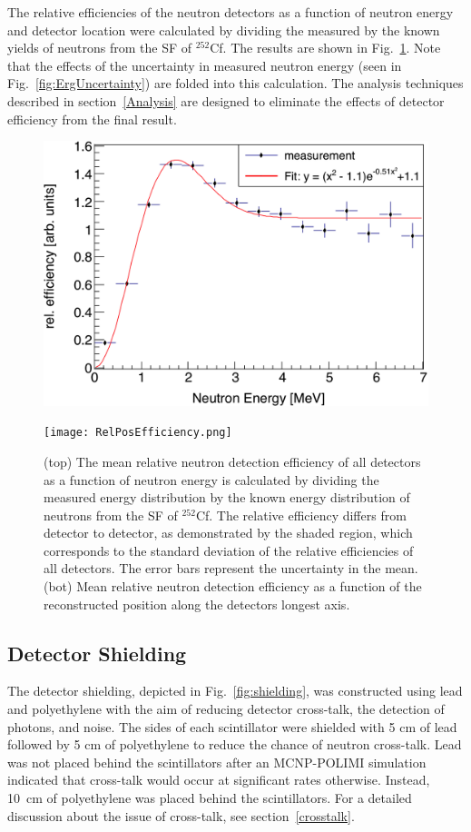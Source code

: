 The relative efficiencies of the neutron detectors as a function of neutron energy and detector location were calculated by dividing the measured by the known yields of neutrons from the SF of $^{252}$Cf.
The results are shown in Fig.~\ref{fig:RelErgEfficiency}.
Note that the effects of the uncertainty in measured neutron energy (seen in Fig.~\ref{fig:ErgUncertainty}) are folded into this calculation.
The analysis techniques described in section~\ref{Analysis} are designed to eliminate the effects of detector efficiency from the final result.
\begin{figure}[]
    \centering
    \includegraphics[width = \figsize\textwidth]{RelErgEfficiency.png}
    \vspace{10cm}

     \texttt{[image: RelPosEfficiency.png]}
     
       \caption{(top) The mean relative neutron detection efficiency of all detectors as a function of neutron energy is calculated by dividing the measured energy distribution by the known energy distribution of neutrons from the SF of $^{252}$Cf. The relative efficiency differs from detector to detector, as demonstrated by the shaded region, which corresponds to the standard deviation of the relative efficiencies of all detectors. The error bars represent the uncertainty in the mean. (bot) Mean relative neutron detection efficiency as a function of the reconstructed position along the detectors longest axis. }
    \label{fig:RelErgEfficiency}
\end{figure}

\subsection{Detector Shielding}
\label{shielding}
The detector shielding, depicted in Fig.~\ref{fig:shielding}, was constructed using lead and polyethylene with the aim of reducing detector cross-talk, the detection of photons, and noise.
The sides of each scintillator were shielded with 5 cm of lead followed by 5 cm of polyethylene to reduce the chance of neutron cross-talk.
Lead was not placed behind the scintillators after an MCNP-POLIMI simulation indicated that cross-talk would occur at significant rates otherwise.
Instead, 10~cm of polyethylene was placed behind the scintillators.
For a detailed discussion about the issue of cross-talk, see section~\ref{crosstalk}.

